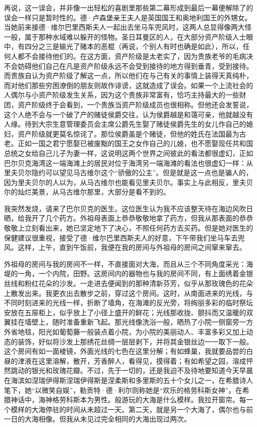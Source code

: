 \par 再说，这一误会，并非像一出轻松的喜剧里那些第二幕形成到最后一幕便解除了的误会一样只是暂时性的。德·卢森堡亲王夫人是英国国王和奥地利国王的外甥女。当她前来接德·维尔巴里西斯夫人一起出去坐马车兜风时，这两人总显得像两大怪一般，属于那种水域难以躲开的怪物。圣日耳曼区的人，在大部分资产阶级人士眼中，有四分之三是输光了赌本的恶棍（再说，个别人有时也确是如此），所以，任何人都不会接待他们的。在这方面，资产阶级是太老实了，因为贵族老爷的毛病决不会妨碍他们自己在凡是资产阶级永远不会受到接待的地方得到垂青，受到接待。而贵族自认为资产阶级了解这一点，所以他们在与己有关的事情上装得天真纯朴，而对他们那些穷困潦倒的朋友则故作诽谤，这就造成了误会。如果一个上流社会的人偶尔与小资产阶级发生关系，因为这个贵族非常富有，恰巧主持最大的一些财团，资产阶级终于会看到，一个贵族当资产阶级成员也很相称。但他还会发誓说，这个人绝不会与一个破了产的赌徒侯爵交往，认为侯爵越是和蔼可亲，他就越没有人缘。待到大宗生意管理委员会主席公爵先生娶了赌徒侯爵先生的女儿作自己的媳妇，资产阶级就更莫名惊诧了。那位侯爵虽是个赌徒，但他的姓氏在法国最为古老。正如一国之君宁愿娶已被废黜的国王之女作自己的儿媳，也不愿娶现任共和国总统之女给自己儿子为妻一样，这说明这两个世界之间彼此的看法都很虚幻，正如巴尔贝克海湾这一端海滩上的居民对位于海湾另一端海滩的看法也很虚幻一样：从里夫贝尔隐约可以望见马古维尔这个“骄傲的公主”。但是就是这一点也是骗人的，因为里夫贝尔的人以为，从马古维尔也能看见里夫贝尔。事实上与此相反，里夫贝尔的灿烂美景，从马古维尔那里，大部分是看不到的。
\par 我突然发烧，请来了巴尔贝克的医生。这位医生认为我不应该整天待在海边风吹日晒，给我开了几个药方。外祖母表面上恭恭敬敬地拿了药方，但我从那表面的恭恭敬敬上立刻看出来，她已坚定地下了决心，不照任何药方去买药。但是她对医生的保健建议很重视，接受了德·维尔巴里西斯夫人的好意，下午带我们坐马车去兜风。这样，上午，直到午饭前，我便在我的房间与外祖母的房间之间窜来窜去。
\par 外祖母的房间与我的房间不一样，不直接面对大海，而且从三个不同角度采光：海堤的一角，一个内院，田野。这房间内的器物也与我的房间不同，有上面绣着金银丝线和粉红花朵的沙发。一走进去便闻到的那种清新芬芳，似乎从那玫瑰色的花朵上散发出来。我更衣出去散步之前，穿过这个房间。这时，从南面进来的光线，与不同时刻进来的光线一样，折断了墙角，在海滩的反光旁，将绚丽多彩的临时祭坛安放在五屉柜上，似乎放上了小径上盛开的鲜花；光线那收拢、颤抖而又温暖的双翼挂在墙壁上，随时准备重新飞起。那光线像洗浴一般，晒热了小院一侧窗旁一方外省地毯，阳光如葡萄藤一般装点着小院，为小院的美丽动人、丰富多彩又加上动态的装饰，好似将沙发上那绣花丝绸一层层剥下，并将其金银丝边一一取下一般。这个房间有如一面棱镜，外面光线的七色在这里分解；有如蜂巢，我就要品尝的白昼的津液在这里溶解，散开，芳香醉人，看得见，摸得着；有如希望之园，溶成怦然跳动的银光和玫瑰花瓣。不过，先于一切的，还是我迫不及待地要知道今天早晨在海滨如涅瑞伊得斯涅瑞伊得斯是涅柔斯和多里斯的五十个女儿之一，在希腊诗人笔下，她“以微笑自娱”，勒贡特·德·利尔则称她是“欢乐的格劳科斯女神”。在希腊神话中，海神格劳科斯本为男性。般游玩的大海是什么模样。我拉开窗帘。每一个模样的大海停驻的时间从未超过一天。第二天，就是另一个大海了，偶尔也与前一日的大海相像。但我从未见过完全相同的大海出现过两次。
